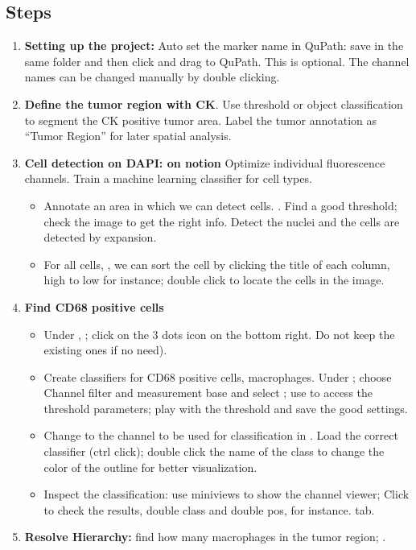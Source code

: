 \documentclass[a4paper,12pt]{article}
\begin{document}
\subsection{Steps}
\begin{enumerate}
    \item \textbf{Setting up the project:} Auto set the marker name in QuPath: \soln {} \solnend save in the same folder and then click and drag to QuPath. This is optional. The channel names can be changed manually by double clicking.
    \item \textbf{Define the tumor region with CK}. Use threshold or object classification to segment the CK positive tumor area. Label the tumor annotation as “Tumor Region” for later spatial analysis.
    \item \textbf{Cell detection on DAPI: on notion} Optimize individual fluorescence channels. Train a machine learning classifier for cell types.
    \begin{itemize}
        \item Annotate an area in which we can detect cells. \soln {} \solnend. Find a good threshold; check the image to get the right info. Detect the nuclei and the cells are detected by expansion.
        \item For all cells, \soln {}\solnend, we can sort the cell by clicking the title of each column, high to low for instance; double click to locate the cells in the image.
    \end{itemize}
    
    \item \textbf{Find CD68 positive cells} 
    \begin{itemize}
    \item Under \soln {}\solnend, \soln {}\solnend; click on the 3 dots icon on the bottom right. Do not keep the existing ones if no need).
    \item Create classifiers for CD68 positive cells, macrophages. Under \soln {}\solnend; choose Channel filter and measurement base and select \soln {}\solnend; use \soln {} \solnend to access the threshold parameters; play with the threshold and save the good settings. 
    \item Change to the channel to be used for classification in \soln {}\solnend. Load the correct classifier (ctrl click); double click the name of the class to change the color of the outline for better visualization.
    \item Inspect the classification: use miniviews to show the channel viewer; Click to check the results, double class and double pos, for instance.\soln {} \solnend tab.
    \end{itemize} 
    \item \textbf{Resolve Hierarchy:} find how many macrophages in the tumor region; \soln {}\solnend. 


\end{enumerate}
\end{document}
